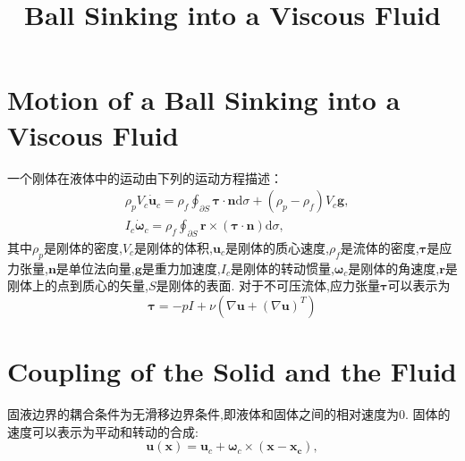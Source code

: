 \documentclass[12pt,halfline,a4paper]{ouparticle}
\begin{document}
\title{Ball Sinking into a Viscous Fluid} 

\author{%
}
\date{}

\maketitle
\tableofcontents
\newpage

\section{Motion of a Ball Sinking into a Viscous Fluid}
一个刚体在液体中的运动由下列的运动方程描述：
\begin{equation}\begin{aligned}
    & \rho_{p}V_{c}\dot{\boldsymbol{u}}_{c}=\rho_{f}\oint_{\partial S}\boldsymbol{\tau}\cdot\boldsymbol{n}\mathrm{d}\sigma+(\rho_{p}-\rho_{f})V_{c}\boldsymbol{g}, \\
    & I_{c}\dot{\boldsymbol{\omega}}_{c}=\rho_{f}\oint_{\partial S}\boldsymbol{r}\times(\boldsymbol{\tau}\cdot\boldsymbol{n})\mathrm{d}\sigma,
   \end{aligned}\end{equation}
其中$\rho_{p}$是刚体的密度,$V_{c}$是刚体的体积,$\boldsymbol{u}_{c}$是刚体的质心速度,$\rho_{f}$是流体的密度,$\boldsymbol{\tau}$是应力张量,$\boldsymbol{n}$是单位法向量,$\boldsymbol{g}$是重力加速度,$I_{c}$是刚体的转动惯量,$\boldsymbol{\omega}_{c}$是刚体的角速度,$\boldsymbol{r}$是刚体上的点到质心的矢量,$S$是刚体的表面.
对于不可压流体,应力张量$\boldsymbol{\tau}$可以表示为
$$\boldsymbol \tau = -pI + \nu (\nabla \boldsymbol{u} + (\nabla \boldsymbol{u})^T)$$

\section{Coupling of the Solid and the Fluid}
固液边界的耦合条件为无滑移边界条件,即液体和固体之间的相对速度为0.
固体的速度可以表示为平动和转动的合成:
\begin{equation}\boldsymbol u(\boldsymbol{x})=\boldsymbol{u}_c+\boldsymbol{\omega}_c\times(\boldsymbol{x}-\boldsymbol{x_c}),\end{equation}
\end{document}
